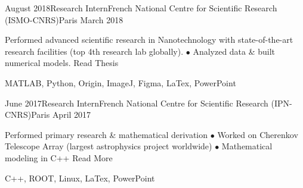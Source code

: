 \begin{experiences}
  \experience
    {August 2018}{Research Intern}{French National Centre for Scientific Research (ISMO-CNRS)}{Paris}
    {March 2018}
    {
\begin{description}
Performed advanced scientific research in Nanotechnology with state-of-the-art research facilities (top 4th research lab globally). $\bullet$ Analyzed data \& built numerical models. \hspace{85pt}   {\footnotesize{Read Thesis}}
\end{description}
}
    {MATLAB, Python, Origin, ImageJ, Figma, LaTex, PowerPoint}
\end{experiences}
\vspace*{-15px} 
\begin{experiences}
  \experience
    {June 2017}{Research Intern}{French National Centre for Scientific Research (IPN-CNRS)}{Paris}
    {April 2017}
    {
\begin{description}
Performed primary research \& mathematical derivation $\bullet$ Worked on Cherenkov Telescope Array (largest astrophysics project worldwide) $\bullet$ Mathematical modeling in C++ \hfill {} {\footnotesize{Read More}}
\end{description}
}
    {C++, ROOT, Linux, LaTex, PowerPoint}
\end{experiences} 

